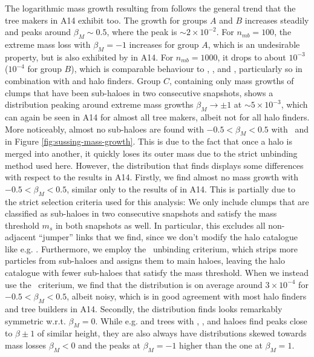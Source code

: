 The logarithmic mass growth resulting from \acacia follows the general trend that the tree
makers in A14 exhibit too. The growth for groups $A$ and $B$ increases steadily and peaks around
$\beta_M \sim 0.5$, where the peak is $\sim2 \times 10^{-2}$. For $n_{mb} = 100$, the extreme mass
loss  with $\beta_M = -1$ increases for group $A$, which is an undesirable property, but is also
exhibited by  in A14. For $n_{mb} = 1000$, it drops to about $10^{-3}$ ($10^{-4}$
for group $B$), which is comparable behaviour to , , and
, particularly so in combination with  and  halo
finders. Group $C$, containing only mass growths of clumps that have been sub-haloes in two
consecutive snapshots, shows a distribution peaking around extreme mass growths $\beta_M
\rightarrow \pm 1$ at $\sim 5 \times 10^{-3}$, which can again be seen in A14 for almost all tree
makers, albeit not for all halo finders. More noticeably, almost no sub-haloes are found with $-0.5
< \beta_M < 0.5$ with \phew\ and \acacia in Figure \ref{fig:sussing-mass-growth}.
This is due to the fact that once a halo is merged into another, it quickly loses its
outer mass due to the strict unbinding method used here. However, the distribution that
\acacia finds displays some differences with respect to the results in A14. Firstly,
we find almost no mass growth with $-0.5 < \beta_M < 0.5$, similar only to the results of
 in A14. This is partially due to the strict selection criteria used for this
analysis: We only include clumps that are classified as sub-haloes in two consecutive snapshots and
satisfy the mass threshold $m_s$ in both snapshots as well. In particular, this excludes all
non-adjacent ``jumper'' links that we find, since we don't modify the halo catalogue like e.g.
. Furthermore, we employ the \sad\ unbinding criterium, which strips more
particles from sub-haloes and assigns them to main haloes, leaving the halo catalogue with fewer
sub-haloes that satisfy the mass threshold. When we instead use the \nosad\
criterium, we find that the distribution is on average around $3 \times 10^{-4}$ for $-0.5 <
\beta_M < 0.5$, albeit noisy, which is in good agreement with most halo finders and tree builders
in A14.
Secondly, the distribution \acacia finds looks remarkably symmetric w.r.t. $\beta_M = 0$.
While e.g. \codename{MergerTree} and \codename{TreeMaker} trees with \codename{AHF}, ,
and \codename{Rockstar} haloes find peaks close to $\beta \pm 1$ of similar height, they are also
always have distributions skewed towards mass losses $\beta_M < 0$ and the peaks at $\beta_M = -1$
higher than the one at $\beta_M = 1$.

